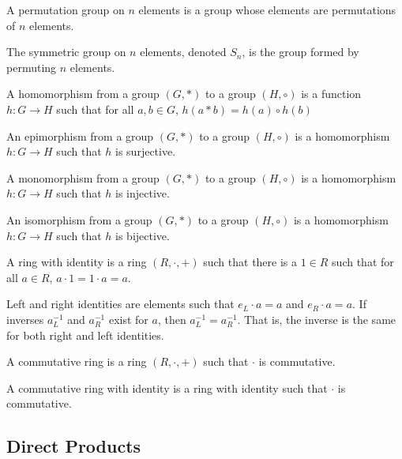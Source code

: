     \begin{definition}
        A permutation group on $n$ elements is a
        group whose elements are permutations of
        $n$ elements.
    \end{definition}
    \begin{definition}
        The symmetric group on $n$ elements,
        denoted $S_{n}$, is the group formed by
        permuting $n$ elements.
    \end{definition}
    \begin{definition}
        A homomorphism from a group $(G,*)$ to
        a group $(H,\circ)$ is a function
        $h:{G}\rightarrow{H}$ such that for all
        ${a,b}\in{G}$, $h(a*b)={h(a)}\circ{h(b)}$
    \end{definition}
    \begin{definition}
        An epimorphism from a group $(G,*)$ to
        a group $(H,\circ)$ is a homomorphism
        $h:{G}\rightarrow{H}$ such that
        $h$ is surjective.
    \end{definition}
    \begin{definition}
        A monomorphism from a group $(G,*)$ to
        a group $(H,\circ)$ is a homomorphism
        $h:{G}\rightarrow{H}$ such that
        $h$ is injective.
    \end{definition}
    \begin{definition}
        An isomorphism from a group $(G,*)$ to
        a group $(H,\circ)$ is a homomorphism
        $h:{G}\rightarrow{H}$ such that
        $h$ is bijective.
    \end{definition}
    \begin{definition}
        A ring with identity is a ring $(R,\cdot,+)$
        such that there is a ${1}\in{R}$ such that for
        all ${a}\in{R}$, ${a}\cdot{1}={1}\cdot{a}=a$.
    \end{definition}
    Left and right identities are elements such that ${e_{L}}\cdot{a}=a$
    and ${e_{R}}\cdot{a}=a$. If inverses $a_{L}^{-1}$ and $a_{R}^{-1}$
    exist for $a$, then $a_{L}^{-1}=a_{R}^{-1}$. That is, the inverse
    is the same for both right and left identities.
    \begin{definition}
        A commutative ring is a ring $(R,\cdot,+)$ such that
        $\cdot$ is commutative.
    \end{definition}
    \begin{definition}
        A commutative ring with identity is a ring with identity such
        that $\cdot$ is commutative.
    \end{definition}
    \subsection{Direct Products}